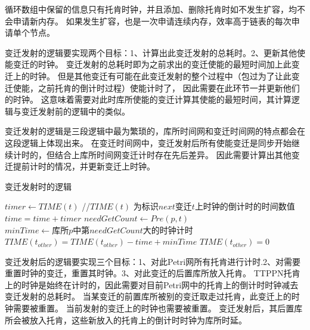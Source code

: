 循环数组中保留的信息只有托肯时钟，并且添加、删除托肯时如不发生扩容，均不会申请新内存。
如果发生扩容，也是一次申请连续内存，效率高于链表的每次申请单个节点。

变迁发射的逻辑要实现两个目标：1、计算出此变迁发射的总耗时。2、更新其他使能变迁的时钟。
变迁发射的总耗时即为之前求出的变迁使能的最短时间加上此变迁上的时钟。
但是其他变迁有可能在此变迁发射的整个过程中（包过为了让此变迁使能，之前托肯的倒计时过程）使能计时了，
因此需要在此环节一并更新他们的时钟。
这意味着需要对此时库所使能的变迁计算其使能的最短时间，其计算逻辑与变迁发射前的逻辑中的类似。

变迁发射的逻辑是三段逻辑中最为繁琐的，库所时间网和变迁时间网的特点都会在这段逻辑上体现出来。
在变迁时间网中，变迁发射后所有使能变迁是同步开始继续计时的，但结合上库所时间网变迁计时存在先后差异。
因此需要计算出其他变迁提前计时的情况，并更新变迁上时钟。

\begin{algorithm}[H]
	\caption{变迁发射时的逻辑}
	\label{alg3-3}
	\begin{algorithmic}
		\State $timer \leftarrow TIME(t)$ //$TIME(t)$ 为标识$next$变迁$t$上时钟的倒计时的时间数值
		\State $time=time+timer$
		\State $needGetCount \leftarrow Pre(p,t)$
		\State $minTime \leftarrow 库所p中第needGetCount大的时钟计时 $
		\State $TIME(t_{other})=TIME(t_{other})-time+minTime$
		$TIME(t_{other}) = 0$
		\EndIf
		\EndIf
		\EndIf
		\EndFor
		\EndProcedure
	\end{algorithmic}
\end{algorithm}

变迁发射后的逻辑要实现三个目标：1、对此Petri网所有托肯进行计时.2、对需要重置时钟的变迁，重置其时钟。3、对此变迁的后置库所放入托肯。
TTPPN托肯上的时钟是始终在计时的，因此需要对目前Petri网中的托肯上的倒计时时钟减去变迁发射的总耗时。
当某变迁的前置库所被别的变迁取走过托肯，此变迁上的时钟需要被重置。
当前发射的变迁上的时钟也需要被重置。
变迁发射后，其后置库所会被放入托肯，这些新放入的托肯上的倒计时时钟为库所时延。

